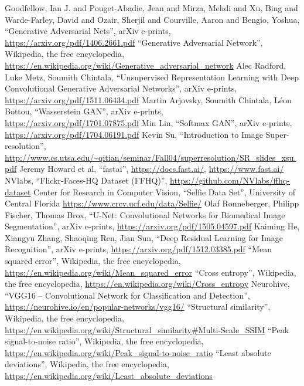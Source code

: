 \documentclass[conference]{IEEEtran}
\begin{document}
	
	
	\begin{thebibliography}{30}
		 {Goodfellow}, Ian J. and {Pouget-Abadie}, Jean and {Mirza}, Mehdi and {Xu}, Bing and {Warde-Farley}, David and {Ozair}, Sherjil and {Courville}, Aaron and {Bengio}, Yoshua, ``Generative Adversarial Nets'', arXiv e-prints, \url{https://arxiv.org/pdf/1406.2661.pdf}
		 ``Generative Adversarial Network'', Wikipedia, the free encyclopedia, \url{https://en.wikipedia.org/wiki/Generative\_adversarial\_network}
		 Alec Radford, Luke Metz, Soumith Chintala, ``Unsupervised Representation Learning with Deep Convolutional Generative Adversarial Networks'', arXiv e-prints, \url{https://arxiv.org/pdf/1511.06434.pdf}
		 Martin Arjovsky, Soumith Chintala, Léon Bottou, ``Wasserstein GAN'', arXiv e-prints, \url{https://arxiv.org/pdf/1701.07875.pdf}
		 Min Lin, ``Softmax GAN'', arXiv e-prints, \url{https://arxiv.org/pdf/1704.06191.pdf}
		  Kevin Su, ``Introduction to Image Super-resolution'', \url{http://www.cs.utsa.edu/~qitian/seminar/Fall04/superresolution/SR_slides_xsu.pdf} 
		 Jeremy Howard et al, ``fastai'', \url{https://docs.fast.ai/}, \url{https://www.fast.ai/}
		 NVlabs, ``Flickr-Faces-HQ Dataset (FFHQ)'', \url{https://github.com/NVlabs/ffhq-dataset}
		 Center for Research in Computer Vision, ``Selfie Data Set'', University of Central Florida \url{https://www.crcv.ucf.edu/data/Selfie/}
		 Olaf Ronneberger, Philipp Fischer, Thomas Brox, ``U-Net: Convolutional Networks for Biomedical Image Segmentation'', arXiv e-prints, \url{https://arxiv.org/pdf/1505.04597.pdf}
		 Kaiming He, Xiangyu Zhang, Shaoqing Ren, Jian Sun, ``Deep Residual Learning for Image Recognition'', arXiv e-prints,  \url{https://arxiv.org/pdf/1512.03385.pdf}
		 ``Mean squared error'', Wikipedia, the free encyclopedia, \url{https://en.wikipedia.org/wiki/Mean_squared_error}
		 ``Cross entropy'', Wikipedia, the free encyclopedia, \url{https://en.wikipedia.org/wiki/Cross_entropy}
		 Neurohive, ``VGG16 – Convolutional Network for Classification and Detection'', \url{https://neurohive.io/en/popular-networks/vgg16/}
		 ``Structural similarity'', Wikipedia, the free encyclopedia, \url{https://en.wikipedia.org/wiki/Structural_similarity#Multi-Scale_SSIM}
		 ``Peak signal-to-noise ratio'', Wikipedia, the free encyclopedia, \url{https://en.wikipedia.org/wiki/Peak_signal-to-noise_ratio}
		 ``Least absolute deviations'', Wikipedia, the free encyclopedia, \url{https://en.wikipedia.org/wiki/Least_absolute_deviations}

\end{thebibliography}
\end{document}
